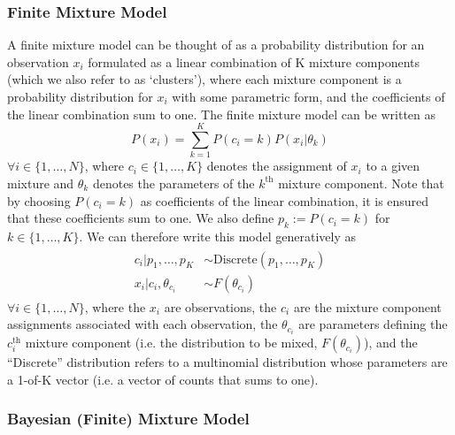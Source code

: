 \documentclass[twocolumn, final]{svjour3}
\begin{document}

\subsubsection{Finite Mixture Model}
\label{sec:finite_mixture}

A finite mixture model can be thought of as a probability distribution for an observation $x_{i}$ formulated as a linear combination of K mixture components (which we also refer to as `clusters'), where each mixture component is a probability distribution for $x_{i}$ with some parametric form, and the coefficients of the linear combination sum to one. The finite mixture model can be written as
\begin{equation}
P(x_{i}) = \sum_{k=1}^{K} P(c_{i} = k)P(x_{i}|\theta_{k})
\end{equation}
$\forall i \in \{ 1, \ldots, N \}$, where $c_{i} \in \{ 1, \ldots, K \}$ denotes the assignment of $x_{i}$ to a given mixture and $\theta_{k}$ denotes the parameters of the $k^{\text{th}}$ mixture component. Note that by choosing $P(c_{i} = k)$ as coefficients of the linear combination, it is ensured that these coefficients sum to one. We also define $p_{k} := P(c_{i} = k)$ for $k \in \{ 1, \ldots, K \} $. We can therefore write this model generatively as
\begin{align}
\begin{split}
	c_{i}|p_{1}, \ldots, p_{K}  &\sim  \text{Discrete}(p_{1}, \ldots, p_{K}) \\
	x_{i}|c_{i}, \theta_{c_{i}}  &\sim  F(\theta_{c_{i}})
\end{split}
\end{align}
$\forall i \in \{ 1, \ldots, N \}$, where the $x_{i}$ are observations, the $c_{i}$ are the mixture component assignments associated with each observation, the $\theta_{c_{i}}$ are parameters defining the $c_{i}^{\text{th}}$ mixture component (i.e. the distribution to be mixed, $F(\theta_{c_{i}})$), and the ``Discrete'' distribution refers to a multinomial distribution whose parameters are a 1-of-K vector (i.e. a vector of counts that sums to one).






\subsubsection{Bayesian (Finite) Mixture Model}
\label{sec:bayesian_mixture}
\end{document}
